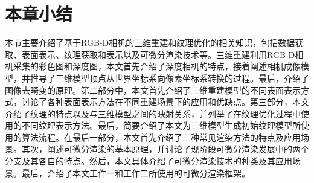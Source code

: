 \section{本章小结}
本节主要介绍了基于RGB-D相机的三维重建和纹理优化的相关知识，包括数据获取、表面表示、纹理获取和表示以及可微分渲染技术等。三维重建利用RGB-D相机采集的彩色图和深度图，本文首先介绍了深度相机的特点，接着阐述相机成像模型，并推导了三维模型顶点从世界坐标系向像素坐标系转换的过程。最后，介绍了图像去畸变的原理。第二部分中，本文首先介绍了三维重建模型的不同表面表示方式，讨论了各种表面表示方法在不同重建场景下的应用和优缺点。第三部分，本文介绍了纹理的特点以及与三维模型之间的映射关系，并列举了在纹理优化过程中使用的不同纹理表示方法。最后，简要介绍了本文为三维模型生成初始纹理模型所使用的算法流程。在最后一部分，本文首先介绍了三种常见渲染方法的特点及应用场景。其次，阐述可微分渲染的基本原理，并讨论了现阶段可微分渲染发展中的两个分支及其各自的特点。然后，本文具体介绍了可微分渲染技术的种类及其应用场景。最后，介绍了本文工作一和工作二所使用的可微分渲染框架。
